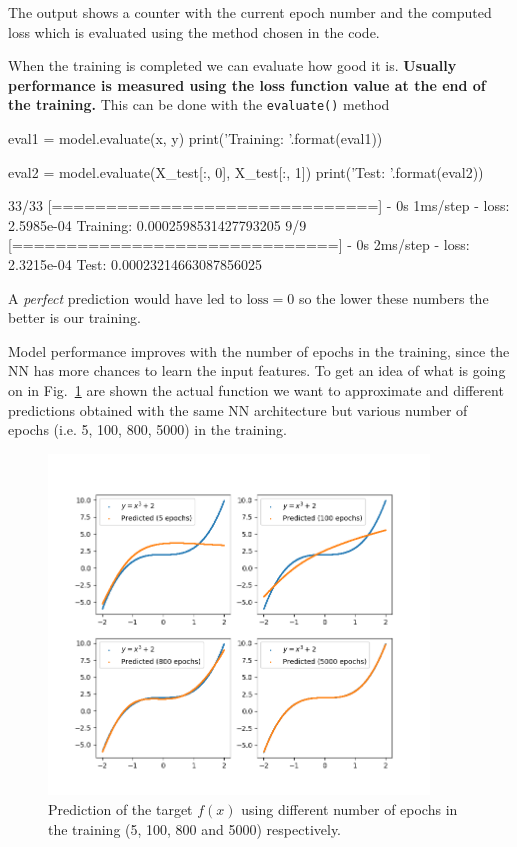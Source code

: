 The output shows a counter with the current epoch number and the computed loss which is evaluated using the method chosen in the code.

When the training is completed we can evaluate how good it is. \textbf{Usually performance is measured using the loss function value at the end of the training.}
This can be done with the \texttt{evaluate()} method

\begin{ipython}
eval1 = model.evaluate(x, y)
print('Training: {}'.format(eval1))

eval2 = model.evaluate(X_test[:, 0], X_test[:, 1])
print('Test: {}'.format(eval2))
\end{ipython}
\begin{ioutput}
33/33 [==============================] - 0s 1ms/step - loss: 2.5985e-04
Training: 0.0002598531427793205
9/9 [==============================] - 0s 2ms/step - loss: 2.3215e-04
Test: 0.00023214663087856025
\end{ioutput}
\noindent

A \emph{perfect} prediction would have led to \(\textrm{loss}=0\) so the lower these numbers the better is our training. 

Model performance improves with the number of epochs in the training, since the NN has more chances to learn the input features. To get an idea of what is going on in Fig.~\ref{fig:training_vs_epochs} are shown the actual function we want to approximate and different predictions obtained with the same NN architecture but various number of epochs (i.e. 5, 100, 800, 5000) in the training.

\begin{figure}[htb]
\centering
\includegraphics[width=0.9\textwidth]{figures/training_vs_epoch}
\caption{Prediction of the target $f(x)$ using different number of epochs in the training (5, 100, 800 and 5000) respectively.}
\label{fig:training_vs_epochs}
\end{figure}

